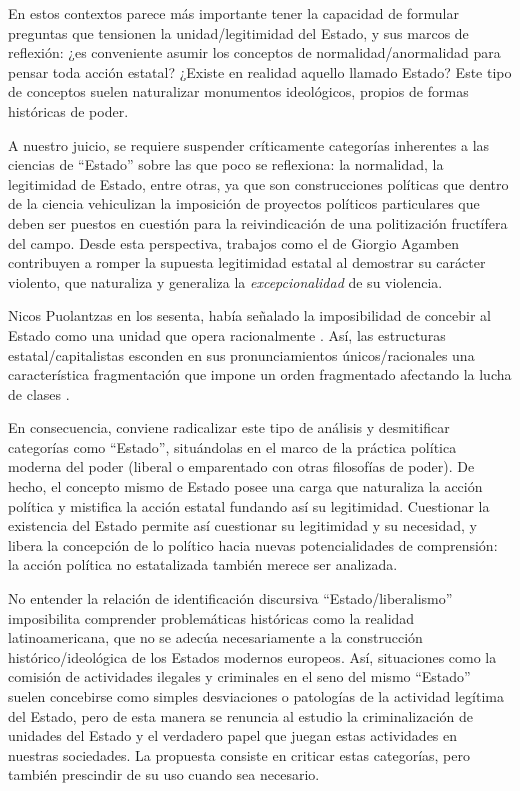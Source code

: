 \documentclass[
  spanish,
  11pt,
  a4paper,
]{scrbook}
\begin{document}
En estos contextos parece más importante tener la capacidad de formular
preguntas que tensionen la unidad/legitimidad del Estado, y sus marcos
de reflexión: ¿es conveniente asumir los conceptos de
normalidad/anormalidad para pensar toda acción estatal? ¿Existe en
realidad aquello llamado Estado? Este tipo de conceptos suelen
naturalizar monumentos ideológicos, propios de formas históricas de
poder.

A nuestro juicio, se requiere suspender críticamente categorías
inherentes a las ciencias de ``Estado'' sobre las que poco se
reflexiona: la normalidad, la legitimidad de Estado, entre otras, ya que
son construcciones políticas que dentro de la ciencia vehiculizan la
imposición de proyectos políticos particulares que deben ser puestos en
cuestión para la reivindicación de una politización fructífera del
campo. Desde esta perspectiva, trabajos como el de Giorgio Agamben
\autocite{Agamben2000,Agamben2003} contribuyen a romper la supuesta
legitimidad estatal al demostrar su carácter violento, que naturaliza y
generaliza la \emph{excepcionalidad} de su violencia.

Nicos Puolantzas en los sesenta, había señalado la imposibilidad de
concebir al Estado como una unidad que opera racionalmente
\autocite{Poulantzas1978,Poulantzas1997}. Así, las estructuras
estatal/capitalistas esconden en sus pronunciamientos únicos/racionales
una característica fragmentación que impone un orden fragmentado
afectando la lucha de clases \autocite{Holloway1982}.

En consecuencia, conviene radicalizar este tipo de análisis y
desmitificar categorías como ``Estado'', situándolas en el marco de la
práctica política moderna del poder (liberal o emparentado con otras
filosofías de poder). De hecho, el concepto mismo de Estado posee una
carga que naturaliza la acción política y mistifica la acción estatal
fundando así su legitimidad. Cuestionar la existencia del Estado permite
así cuestionar su legitimidad y su necesidad, y libera la concepción de
lo político hacia nuevas potencialidades de comprensión: la acción
política no estatalizada también merece ser analizada.

No entender la relación de identificación discursiva
``Estado/liberalismo'' imposibilita comprender problemáticas históricas
como la realidad latinoamericana, que no se adecúa necesariamente a la
construcción histórico/ideológica de los Estados modernos europeos. Así,
situaciones como la comisión de actividades ilegales y criminales en el
seno del mismo ``Estado'' suelen concebirse como simples desviaciones o
patologías de la actividad legítima del Estado, pero de esta manera se
renuncia al estudio la criminalización de unidades del Estado y el
verdadero papel que juegan estas actividades en nuestras sociedades. La
propuesta consiste en criticar estas categorías, pero también prescindir
de su uso cuando sea necesario.
\end{document}
